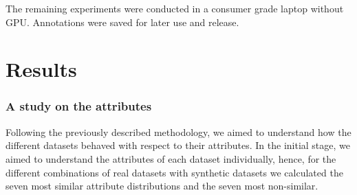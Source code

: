\documentclass[a4paper, 10pt, conference]{ieeeconf}      %
\begin{document}
The remaining experiments were conducted in a consumer grade laptop without GPU. Annotations were saved for later use and release. 


\section{Results}



\subsubsection{A study on the attributes}

Following the previously described methodology, we aimed to understand how the different datasets behaved with respect to their attributes. In the initial stage, we aimed to understand the attributes of each dataset individually, hence, for the different combinations of real datasets with synthetic datasets we calculated the seven most similar attribute distributions and the seven most non-similar. 
\end{document}
